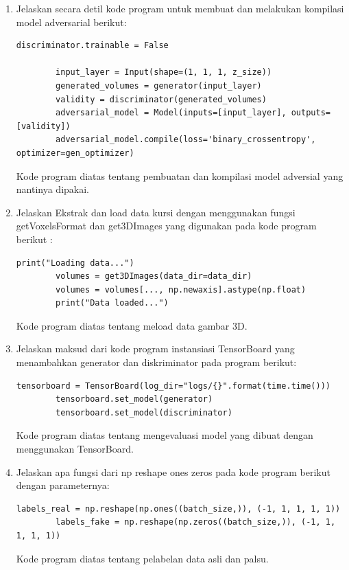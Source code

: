 \begin{enumerate}
    \item Jelaskan secara detil kode program untuk membuat dan melakukan kompilasi model adversarial berikut:
    \begin{lstlisting}[caption=Membuat dan Kompilasi Model Adversarial,label={lst:8.3}]
        discriminator.trainable = False

        input_layer = Input(shape=(1, 1, 1, z_size))
        generated_volumes = generator(input_layer)
        validity = discriminator(generated_volumes)
        adversarial_model = Model(inputs=[input_layer], outputs=[validity])
        adversarial_model.compile(loss='binary_crossentropy', optimizer=gen_optimizer)
    \end{lstlisting}
    Kode program diatas tentang pembuatan dan kompilasi model adversial yang nantinya dipakai.
    
    \item Jelaskan Ekstrak dan load data kursi dengan menggunakan fungsi getVoxelsFormat dan get3DImages yang digunakan pada kode program berikut :
    \begin{lstlisting}[caption=Ekstraksi dan load dataset,label={lst:8.4}]
        print("Loading data...")
        volumes = get3DImages(data_dir=data_dir)
        volumes = volumes[..., np.newaxis].astype(np.float)
        print("Data loaded...")
    \end{lstlisting}
    Kode program diatas tentang meload data gambar 3D.
    
    \item Jelaskan maksud dari kode program instansiasi TensorBoard yang menambahkan generator dan diskriminator pada program berikut:
    \begin{lstlisting}[caption=Instansiasi tensorboard,label={lst:8.5}]
        tensorboard = TensorBoard(log_dir="logs/{}".format(time.time()))
        tensorboard.set_model(generator)
        tensorboard.set_model(discriminator)
    \end{lstlisting}
    Kode program diatas tentang mengevaluasi model yang dibuat dengan menggunakan TensorBoard.
    
    \item Jelaskan apa fungsi dari np reshape ones zeros pada kode program berikut dengan parameternya:
    \begin{lstlisting}[caption=Pelabelan dataset,label={lst:8.6}]
        labels_real = np.reshape(np.ones((batch_size,)), (-1, 1, 1, 1, 1))
        labels_fake = np.reshape(np.zeros((batch_size,)), (-1, 1, 1, 1, 1))
    \end{lstlisting}
    Kode program diatas tentang pelabelan data asli dan palsu.
    

\end{enumerate}
